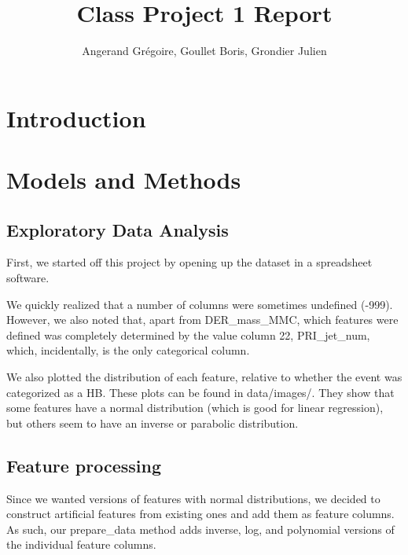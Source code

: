 \documentclass[10pt,conference,compsocconf]{IEEEtran}
\begin{document}
\title{Class Project 1 Report}

\author{
  Angerand Gr\'egoire, Goullet Boris, Grondier Julien 
}

\maketitle

\begin{abstract}
\end{abstract}

\section{Introduction}

\section{Models and Methods}
\subsection{Exploratory Data Analysis}
First, we started off this project by opening up the dataset in a spreadsheet software.

We quickly realized that a number of columns were sometimes undefined (-999). However, we also noted that, apart from DER_mass_MMC, which features were defined was completely determined by the value column 22, PRI_jet_num, which, incidentally, is the only categorical column. %

We also plotted the distribution of each feature, relative to whether the event was categorized as a HB. These plots can be found in data/images/. They show that some features have a normal distribution (which is good for linear regression), but others seem to have an inverse %
or parabolic distribution.

\subsection{Feature processing}
Since we wanted versions of features with normal distributions, we decided to construct artificial features from existing ones and add them as feature columns. As such, our prepare_data method adds inverse, log, and polynomial versions of the individual feature columns.
\end{document}
